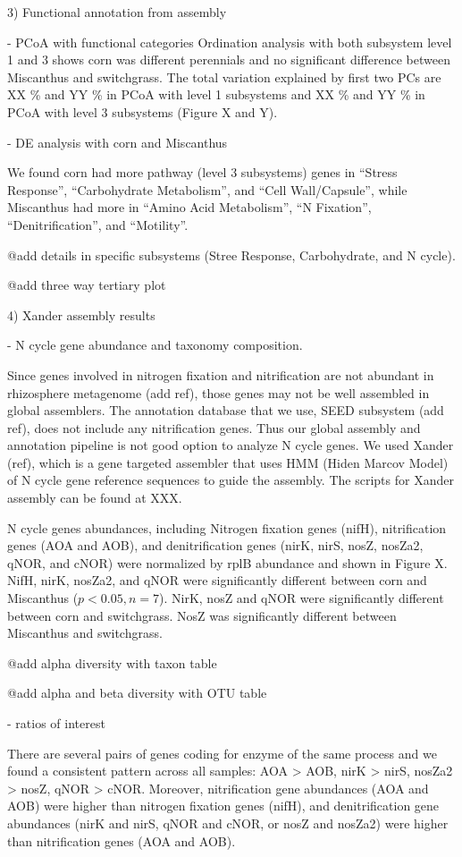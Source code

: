 \documentclass[12pt]{article}
\begin{document}
3) Functional annotation from assembly

- PCoA with functional categories
Ordination analysis with both subsystem level 1 and 3 shows corn was different perennials and no significant difference between Miscanthus and switchgrass. The total variation explained by first two PCs are XX \% and YY \% in PCoA with level 1 subsystems and XX \% and YY \% in PCoA with level 3 subsystems (Figure X and Y).

- DE analysis with corn and Miscanthus

We found corn had more pathway (level 3 subsystems) genes in ``Stress Response'', ``Carbohydrate Metabolism'', and ``Cell Wall/Capsule'', while Miscanthus had more in ``Amino Acid Metabolism'', ``N Fixation'', ``Denitrification'', and ``Motility''.

  @add details in specific subsystems (Stree Response, Carbohydrate, and N cycle).

  @add three way tertiary plot

4) Xander assembly results

- N cycle gene abundance and taxonomy composition.

Since genes involved in nitrogen fixation and nitrification are not abundant in rhizosphere metagenome (add ref), those genes may not be well assembled in global assemblers. The annotation database that we use, SEED subsystem (add ref), does not include any nitrification genes. Thus our global assembly and annotation pipeline is not good option to analyze N cycle genes. We used Xander (ref), which is a gene targeted assembler that uses HMM (Hiden Marcov Model) of N cycle gene reference sequences to guide the assembly. The scripts for Xander assembly can be found at XXX.

N cycle genes abundances, including Nitrogen fixation genes (nifH), nitrification genes (AOA and AOB), and denitrification genes (nirK, nirS, nosZ, nosZa2, qNOR, and cNOR) were normalized by rplB abundance and shown in Figure X. NifH, nirK, nosZa2, and qNOR were significantly different between corn and Miscanthus ($p < 0.05, n = 7$). NirK, nosZ and qNOR  were significantly different between corn and switchgrass. NosZ was significantly different between Miscanthus and switchgrass.

@add alpha diversity with taxon table

@add alpha and beta diversity with OTU table

- ratios of interest

There are several pairs of genes coding for enzyme of the same process and we found a consistent pattern across all samples: AOA {\textgreater} AOB, nirK {\textgreater} nirS, nosZa2 {\textgreater} nosZ, qNOR {\textgreater} cNOR. Moreover, nitrification gene abundances (AOA and AOB) were higher than nitrogen fixation genes (nifH), and denitrification gene abundances (nirK and nirS, qNOR and cNOR, or nosZ and nosZa2) were higher than nitrification genes (AOA and AOB).
\end{document}
